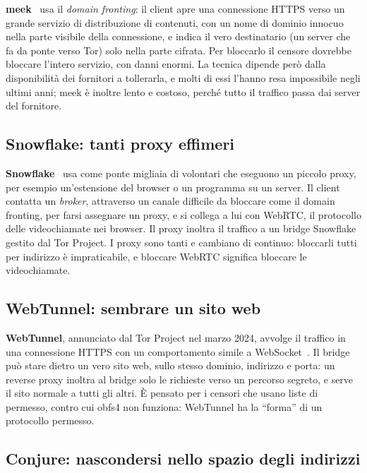 \textbf{meek}~\cite{fifield2015fronting} usa il \emph{domain fronting}: il client apre una connessione HTTPS verso un grande servizio di distribuzione di contenuti, con un nome di dominio innocuo nella parte visibile della connessione, e indica il vero destinatario (un server che fa da ponte verso Tor) solo nella parte cifrata. Per bloccarlo il censore dovrebbe bloccare l'intero servizio, con danni enormi. La tecnica dipende però dalla disponibilità dei fornitori a tollerarla, e molti di essi l'hanno resa impossibile negli ultimi anni; meek è inoltre lento e costoso, perché tutto il traffico passa dai server del fornitore.

\subsection{Snowflake: tanti proxy effimeri}

\textbf{Snowflake}~\cite{bocovich2024snowflake} usa come ponte migliaia di volontari che eseguono un piccolo proxy, per esempio un'estensione del browser o un programma su un server. Il client contatta un \emph{broker}, attraverso un canale difficile da bloccare come il domain fronting, per farsi assegnare un proxy, e si collega a lui con WebRTC, il protocollo delle videochiamate nei browser. Il proxy inoltra il traffico a un bridge Snowflake gestito dal Tor Project. I proxy sono tanti e cambiano di continuo: bloccarli tutti per indirizzo è impraticabile, e bloccare WebRTC significa bloccare le videochiamate.

\subsection{WebTunnel: sembrare un sito web}

\textbf{WebTunnel}, annunciato dal Tor Project nel marzo 2024, avvolge il traffico in una connessione HTTPS con un comportamento simile a WebSocket~\cite{torblogwebtunnel}. Il bridge può stare dietro un vero sito web, sullo stesso dominio, indirizzo e porta: un reverse proxy inoltra al bridge solo le richieste verso un percorso segreto, e serve il sito normale a tutti gli altri. È pensato per i censori che usano liste di permesso, contro cui obfs4 non funziona: WebTunnel ha la \enquote{forma} di un protocollo permesso.

\subsection{Conjure: nascondersi nello spazio degli indirizzi}

